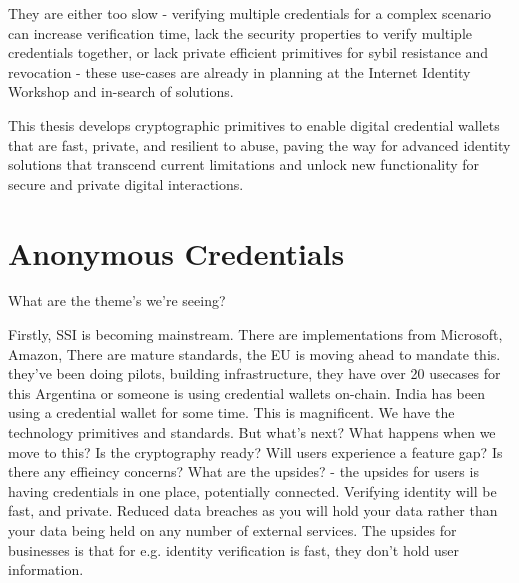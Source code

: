 They are either too slow - verifying multiple credentials for a complex scenario can increase verification time, lack the security properties to verify multiple credentials together, or lack private efficient primitives for sybil resistance and revocation - these use-cases are already in planning at the Internet Identity Workshop \cite{internet_identity_workshop_internet_nodate} and in-search of solutions.

This thesis develops cryptographic primitives to enable digital credential wallets that are fast, private, and resilient to abuse, paving the way for advanced identity solutions that transcend current limitations and unlock new functionality for secure and private digital interactions.


\section{Anonymous Credentials}




What are the theme's we're seeing? 

Firstly, SSI is becoming mainstream. There are implementations from Microsoft, Amazon, 
There are mature standards, the EU is moving ahead to mandate this. they've been doing pilots, building infrastructure, they have over 20 usecases for this
Argentina or someone is using credential wallets on-chain. India has been using a credential wallet for some time. 
This is magnificent. We have the technology primitives and standards.
But what's next? What happens when we move to this? 
Is the cryptography ready? 
Will users experience a feature gap? Is there any effieincy concerns? 
What are the upsides? - the upsides for users is having credentials in one place, potentially connected. Verifying identity will be fast, and private. Reduced data breaches as you will hold your data rather than your data being held on any number of external services. The upsides for businesses is that for e.g. identity verification is fast, they don't hold user information. 


